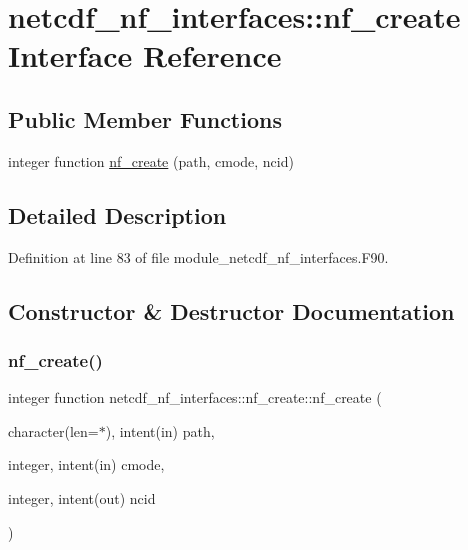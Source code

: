 \hypertarget{interfacenetcdf__nf__interfaces_1_1nf__create}{}\section{netcdf\+\_\+nf\+\_\+interfaces\+:\+:nf\+\_\+create Interface Reference}
\label{interfacenetcdf__nf__interfaces_1_1nf__create}
\subsection*{Public Member Functions}
\begin{DoxyCompactItemize}
\item 
integer function \hyperlink{interfacenetcdf__nf__interfaces_1_1nf__create_ac8eb89c67621d7a6721ccd74d04d9931}{nf\+\_\+create} (path, cmode, ncid)
\end{DoxyCompactItemize}


\subsection{Detailed Description}


Definition at line 83 of file module\+\_\+netcdf\+\_\+nf\+\_\+interfaces.\+F90.



\subsection{Constructor \& Destructor Documentation}
\mbox{\label{interfacenetcdf__nf__interfaces_1_1nf__create_ac8eb89c67621d7a6721ccd74d04d9931}} 
\subsubsection{\texorpdfstring{nf\+\_\+create()}{nf\_create()}}
{\footnotesize\ttfamily integer function netcdf\+\_\+nf\+\_\+interfaces\+::nf\+\_\+create\+::nf\+\_\+create (\begin{DoxyParamCaption}\item[{character(len=$\ast$), intent(in)}]{path,  }\item[{integer, intent(in)}]{cmode,  }\item[{integer, intent(out)}]{ncid }\end{DoxyParamCaption})}



